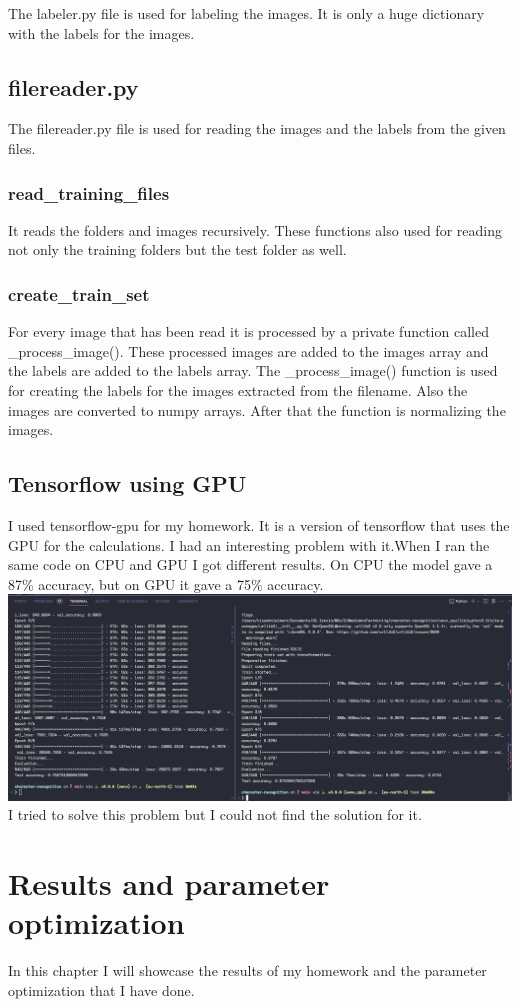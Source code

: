 \documentclass[11pt,a4paper,oneside]{report}
\begin{document}
The labeler.py file is used for labeling the images. It is only a huge dictionary with the labels for the images.

\section{filereader.py}

The filereader.py file is used for reading the images and the labels from the given files.
\subsection{read\_training\_files}
It reads the folders and images recursively.
These functions also used for reading not only the training folders but the test folder as well.

\subsection{create\_train\_set}
For every image that has been read it is processed by a private function called \_process\_image().
These processed images are added to the images array and the labels are added to the labels array.
The \_process\_image() function is used for creating the labels for the images extracted from the filename.
Also the images are converted to numpy arrays.
After that the function is normalizing the images.

\section{Tensorflow using GPU}

I used tensorflow-gpu for my homework.
It is a version of tensorflow that uses the GPU for the calculations. I had an interesting problem with it.When I ran the same code on CPU and GPU I got different results.
On CPU the model gave a 87\% accuracy, but on GPU it gave a 75\% accuracy.
\includegraphics[width=\textwidth]{cpuvsgpu}
I tried to solve this problem but I could not find the solution for it.

\chapter{Results and parameter optimization}

In this chapter I will showcase the results of my homework and the parameter optimization that I have done.
\end{document}
